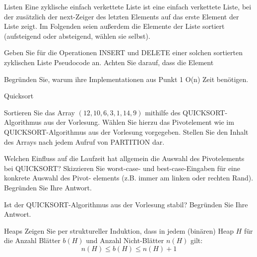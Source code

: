 \documentclass{exercisesheet}
\begin{document}
\begin{eexercises}{Listen}{
    Eine zyklische einfach verkettete Liste ist eine einfach verkettete Liste, bei der zusätzlich der next-Zeiger des letzten Elements auf das erste Element der Liste zeigt. Im Folgenden seien außerdem die Elemente der Liste sortiert (aufsteigend oder absteigend, wählen sie selbst).
  }
  \item Geben Sie für die Operationen INSERT und DELETE einer solchen sortierten zyklischen Liste Pseudocode an. Achten Sie darauf, dass die Element
  \item Begründen Sie, warum ihre Implementationen aus Punkt 1 O(n) Zeit benötigen.
\end{eexercises}

\begin{exercises}{Quicksort}
\item Sortieren Sie das Array $(12, 10, 6, 3, 1, 14, 9)$ mithilfe des QUICKSORT-Algorithmus aus der Vorlesung. Wählen Sie hierzu das Pivotelement wie im QUICKSORT-Algorithmus aus der Vorlesung vorgegeben. Stellen Sie den Inhalt des Arrays nach jedem Aufruf von PARTITION dar.
\item Welchen Einfluss auf die Laufzeit hat allgemein die Auswahl des Pivotelements bei QUICKSORT? Skizzieren Sie worst-case- und best-case-Eingaben für eine konkrete Auswahl des Pivot- elements (z.B. immer am linken oder rechten Rand). Begründen Sie Ihre Antwort.
\item Ist der QUICKSORT-Algorithmus aus der Vorlesung stabil? Begründen Sie Ihre Antwort.
\end{exercises}

\begin{exercise}{Heaps}
  Zeigen Sie per struktureller Induktion, dass in jedem (binären) Heap $H$ für die Anzahl Blätter $b(H)$ und Anzahl Nicht-Blätter $n(H)$ gilt:
  \begin{equation*}
    n(H) \leq b(H) \leq n(H)+1
  \end{equation*}
\end{exercise}
\end{document}
